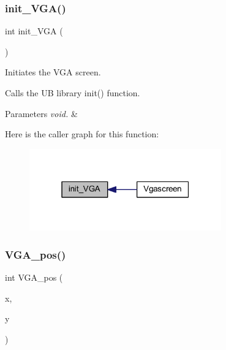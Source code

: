 \subsubsection{\texorpdfstring{init\+\_\+\+V\+G\+A()}{init\_VGA()}}
{\footnotesize\ttfamily int init\+\_\+\+V\+GA (\begin{DoxyParamCaption}\item[{void}]{ }\end{DoxyParamCaption})\hspace{0.3cm}{\ttfamily [private]}}



Initiates the V\+GA screen. 

Calls the UB library init() function.


\begin{DoxyParams}{Parameters}
{\em void.} & \\
\hline
\end{DoxyParams}
Here is the caller graph for this function\+:\nopagebreak
\begin{figure}[H]
\begin{center}
\leavevmode
\includegraphics[width=235pt]{class_vgascreen_a8240f97328e1e32fdec08a113c927e4f_icgraph}
\end{center}
\end{figure}
\mbox{\label{class_vgascreen_a4e52b131d405cf11ad6aed9b993ed138}} 
\subsubsection{\texorpdfstring{V\+G\+A\+\_\+pos()}{VGA\_pos()}}
{\footnotesize\ttfamily int V\+G\+A\+\_\+pos (\begin{DoxyParamCaption}\item[{int}]{x,  }\item[{int}]{y }\end{DoxyParamCaption})\hspace{0.3cm}{\ttfamily [private]}}



